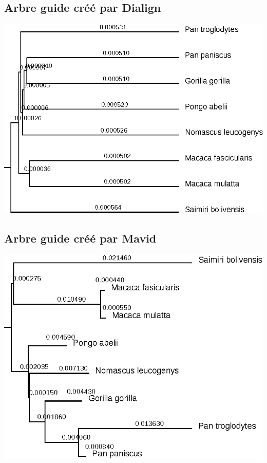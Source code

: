 \documentclass[10.9pt]{article} %
\begin{document}
\subsection{Arbre guide créé par Dialign}\label{21}
\includegraphics{annexes/question_4/dialign/foxp4_ortho.eps}

\subsection{Arbre guide créé par Mavid}\label{22}
\includegraphics{annexes/question_4/Mavid/mavid.eps}
\end{document}
